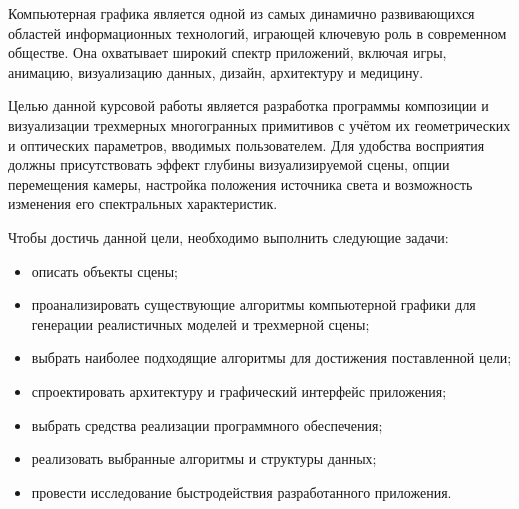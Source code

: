
Компьютерная графика является одной из самых динамично развивающихся областей информационных технологий, играющей ключевую роль в современном обществе. Она охватывает широкий спектр приложений, включая игры, анимацию, визуализацию данных, дизайн, архитектуру и медицину.

Целью данной курсовой работы является разработка программы композиции и визуализации трехмерных многогранных примитивов с учётом их геометрических и оптических параметров, вводимых пользователем. Для удобства восприятия должны присутствовать эффект глубины визуализируемой сцены, опции перемещения камеры, настройка положения источника света и возможность изменения его спектральных характеристик.

Чтобы достичь данной цели, необходимо выполнить следующие задачи:
\begin{itemize}[label=--]
	\item описать объекты сцены;
	\item проанализировать существующие алгоритмы компьютерной графики для генерации реалистичных моделей и трехмерной сцены;
	\item выбрать наиболее подходящие алгоритмы для достижения поставленной цели;
	\item спроектировать архитектуру и графический интерфейс приложения;
	\item выбрать средства реализации программного обеспечения;
	\item реализовать выбранные алгоритмы и структуры данных;
	\item провести исследование быстродействия разработанного приложения.
\end{itemize}

\clearpage
